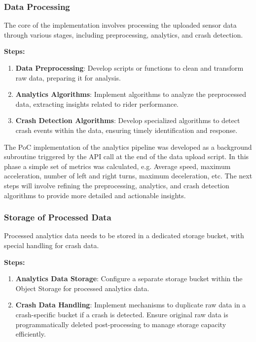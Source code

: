 \subsubsection{Data Processing}
The core of the implementation involves processing the uploaded sensor data through various stages, including preprocessing, analytics, and crash detection.

\textbf{Steps:}
\begin{enumerate}
    \item \textbf{Data Preprocessing}: Develop scripts or functions to clean and transform raw data, preparing it for analysis.
    \item \textbf{Analytics Algorithms}: Implement algorithms to analyze the preprocessed data, extracting insights related to rider performance.
    \item \textbf{Crash Detection Algorithms}: Develop specialized algorithms to detect crash events within the data, ensuring timely identification and response.
\end{enumerate}

The PoC implementation of the analytics pipeline was developed as a background subroutine triggered by the API call at the end of the data upload script. In this phase a simple set of metrics was calculated, e.g. Average speed, maximum acceleration, number of left and right turns, maximum deceleration, etc. The next steps will involve refining the preprocessing, analytics, and crash detection algorithms to provide more detailed and actionable insights.

\subsubsection{Storage of Processed Data}
Processed analytics data needs to be stored in a dedicated storage bucket, with special handling for crash data.

\textbf{Steps:}
\begin{enumerate}
    \item \textbf{Analytics Data Storage}: Configure a separate storage bucket within the Object Storage for processed analytics data.
    \item \textbf{Crash Data Handling}: Implement mechanisms to duplicate raw data in a crash-specific bucket if a crash is detected. Ensure original raw data is programmatically deleted post-processing to manage storage capacity efficiently.
\end{enumerate}

